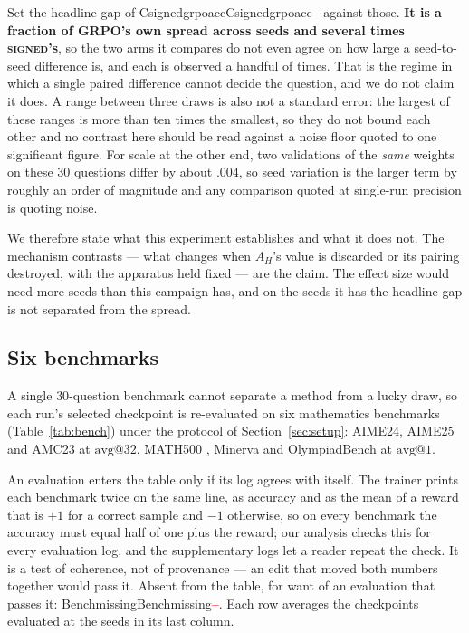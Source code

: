 \documentclass[11pt]{article}
\newcommand{\AH}{A_{H}}
\providecommand{\PENDING}{\textcolor{red}{\textbf{--}}}
\newcommand{\num}[1]{\ifcsname #1\endcsname\csname #1\endcsname\else\PENDING\fi}
\begin{document}
Set the headline gap of \num{Csignedgrpoacc} against those. \textbf{It is a fraction
of GRPO's own spread across seeds and several times \textsc{signed}'s}, so the two arms it
compares do not even agree on how large a seed-to-seed difference is, and each is
observed a handful of times. That is the regime in which a single paired difference
cannot decide the question, and we do not claim it does. A range between three draws
is also not a standard error: the largest of these ranges is more than ten times the
smallest, so they do not bound each other and no contrast here should be read against
a noise floor quoted to one significant figure. For scale at the other end,
two validations of the \emph{same} weights on these $30$ questions differ by about
$.004$, so seed variation is the larger term by roughly an order of magnitude and
any comparison quoted at single-run precision is quoting noise.

We therefore state what this experiment establishes and what it does not. The
mechanism contrasts --- what changes when $\AH$'s value is discarded or its pairing
destroyed, with the apparatus held fixed --- are the claim. The effect size would need more seeds than
this campaign has, and on the seeds it has the headline gap is not separated from
the spread.

\subsection{Six benchmarks}
\label{sec:res:bench}

A single $30$-question benchmark cannot separate a method from a lucky draw, so each
run's selected checkpoint is re-evaluated on six mathematics benchmarks
(Table~\ref{tab:bench}) under the protocol of Section~\ref{sec:setup}: AIME24, AIME25
and AMC23 at $\mathrm{avg@}32$, MATH500 \citep{hendrycks2021measuring,lightman2024lets}, Minerva
\citep{lewkowycz2022solving} and OlympiadBench \citep{he2024olympiadbench} at
$\mathrm{avg@}1$.

An evaluation enters the table only if its log agrees with itself. The trainer prints
each benchmark twice on the same line, as accuracy and as the mean of a reward that is
$+1$ for a correct sample and $-1$ otherwise, so on every benchmark the accuracy must
equal half of one plus the reward; our analysis checks this for every evaluation log,
and the supplementary logs let a reader repeat the check. It is a test of coherence, not of provenance
--- an edit that moved both numbers together would pass it. Absent from the table,
for want of an evaluation that passes it: \num{Benchmissing}. Each row averages the
checkpoints evaluated at the seeds in its last column.
\end{document}
